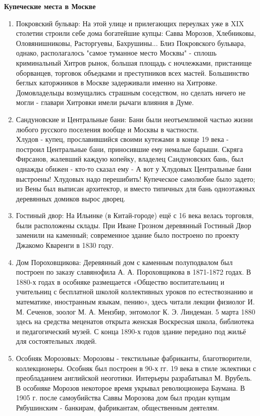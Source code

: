 \documentclass[a4paper,12pt]{article}
\renewcommand{\thesection}[1]{
\vspace{5 pt}
\Large
\noindent \textbf{{#1}}
\normalsize
\par
}
\begin{document}
\thesection{Купеческие места в Москве}
\begin{enumerate}

\item{Покровский бульвар:} На этой улице и прилегающих переулках уже в XIX столетии строили себе дома богатейшие купцы: Савва Морозов, Хлебниковы, Оловянишниковы, Расторгуевы, Бахрушины... Близ Покровского бульвара, однако, располагалось "самое туманное место Москвы" - сплошь криминальный Хитров рынок, большая площадь с ночлежками, пристанище оборванцев, торговок объедками и преступников всех мастей. Большинство беглых каторжников в Москве задерживали именно на Хитровке. Домовладельцы возмущались страшным соседством, но сделать ничего не могли - главари Хитровки имели рычаги влияния в Думе.
\item{Сандуновские и Центральные бани:} Бани были неотъемлимой частью жизни любого русского поселения вообще и Москвы в частности.\\
Хлудов - купец, прославившийся своими кутежами в конце 19 века - построил Центральные бани, приносившие ему немалые барыши. Скряга Фирсанов, жалевший каждую копейку, владелец Сандуновских бань, был однажды обижен - кто-то сказал ему - А вот у Хлудовых Центральные бани выстроены! Хлудовых надо перешибить!
Купеческое самолюбие было задето; из Вены был выписан архитектор, и вместо типичных для бань одноэтажных деревянных домиков вырос дворец.
\item{Гостиный двор}: На Ильинке (в Китай-городе) ещё с 16 века велась торговля, были расположены склады. При Иване Грозном деревянный Гостиный Двор заменили на каменный; современное здание было построено по проекту Джакомо Кваренги в 1830 году.

\item{Дом Пороховщикова:} Деревянный дом с каменным полуподвалом был построен по заказу славянофила А. А. Пороховщикова в 1871-1872 годах. В 1880-х годах в особняке размещается «Общество воспитательниц и учительниц с бесплатной школой коллективных уроков по естествознанию и математике, иностранным языкам, пению», здесь читали лекции физиолог И. М. Сеченов, зоолог М. А. Мензбир, энтомолог К. Э. Линдеман. 5 марта 1880 здесь на средства меценатов открыта женская Воскресная школа, библиотека и педагогический музей. С конца 1890-х годов здание передано под жильё для состоятельных людей.

\item{Особняк Морозовых:} Морозовы - текстильные фабриканты, благотворители, коллекционеры. Особняк был построен в 90-х гг. 19 века в стиле эклектики с преобладанием английской неоготики. Интерьеры разрабатывал М. Врубель.\\
В особняке Морозов некоторое время укрывал революционера Баумана. В 1905 г. после самоубийства Саввы Морозова дом был продан купцам Рябушинским - банкирам, фабрикантам, общественным деятелям.


\end{enumerate}
\end{document}
